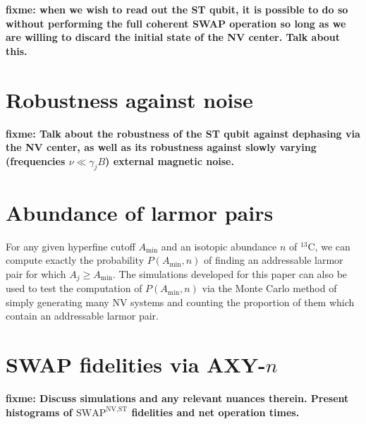 \documentclass[twocolumn]{revtex4-1}
\renewcommand{\t}{\text} %
\newcommand{\p}[1]{\left(#1\right)} %
\newcommand{\SWAP}{\t{SWAP}}
\newcommand{\NV}{\t{NV}}
\newcommand{\ST}{\t{ST}}
\newcommand{\fixme}[1]{{\bf \color{red} fixme: #1}}
\begin{document}
\fixme{when we wish to read out the ST qubit, it is possible to do so
  without performing the full coherent SWAP operation so long as we
  are willing to discard the initial state of the NV center. Talk
  about this.}


\section{Robustness against noise}

\fixme{Talk about the robustness of the ST qubit against dephasing via
  the NV center, as well as its robustness against slowly varying
  (frequencies $\nu\ll\gamma_jB$) external magnetic noise.}


\section{Abundance of larmor pairs}

For any given hyperfine cutoff $A_{\t{min}}$ and an isotopic abundance
$n$ of $^{13}$C, we can compute exactly the probability
$P\p{A_{\t{min}},n}$ of finding an addressable larmor pair for which
$A_j\ge A_{\t{min}}$. The simulations developed for this paper can
also be used to test the computation of $P\p{A_{\t{min}},n}$ via the
Monte Carlo method of simply generating many NV systems and counting
the proportion of them which contain an addressable larmor pair.


\section{SWAP fidelities via AXY-$n$}

\fixme{Discuss simulations and any relevant nuances therein. Present
  histograms of $\SWAP^{\NV,\ST}$ fidelities and net operation times.}



\end{document}
